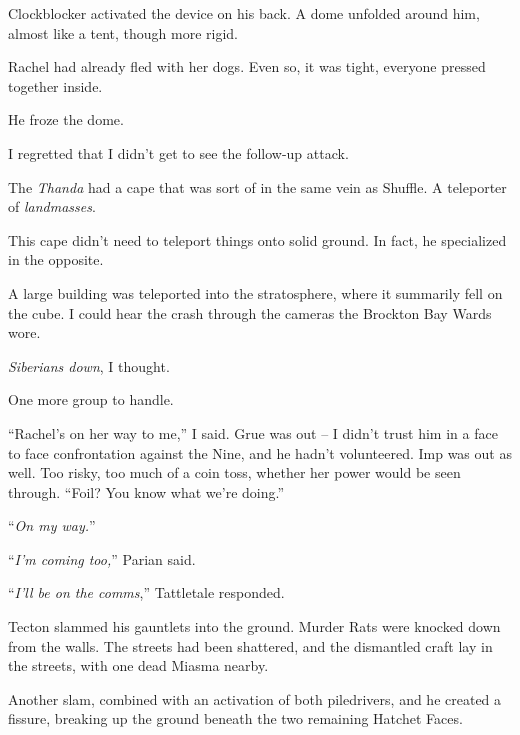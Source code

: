 Clockblocker activated the device on his back.  A dome unfolded around him, almost like a tent, though more rigid.



Rachel had already fled with her dogs.  Even so, it was tight, everyone pressed together inside.



He froze the dome.



I regretted that I didn't get to see the follow-up attack.



The \emph{Thanda} had a cape that was sort of in the same vein as Shuffle.  A teleporter of \emph{landmasses}.



This cape didn't need to teleport things onto solid ground.  In fact, he specialized in the opposite.



A large building was teleported into the stratosphere, where it summarily fell on the cube.  I could hear the crash through the cameras the Brockton Bay Wards wore.



\emph{Siberians down}, I thought.



One more group to handle.



``Rachel's on her way to me,'' I said.  Grue was out – I didn't trust him in a face to face confrontation against the Nine, and he hadn't volunteered.  Imp was out as well.  Too risky, too much of a coin toss, whether her power would be seen through.  ``Foil?  You know what we're doing.''



``\emph{On my way.}''



``\emph{I'm coming too,}'' Parian said.



``\emph{I'll be on the comms},'' Tattletale responded.



\sectionbreak



Tecton slammed his gauntlets into the ground.  Murder Rats were knocked down from the walls.  The streets had been shattered, and the dismantled craft lay in the streets, with one dead Miasma nearby.



Another slam, combined with an activation of both piledrivers, and he created a fissure, breaking up the ground beneath the two remaining Hatchet Faces.



